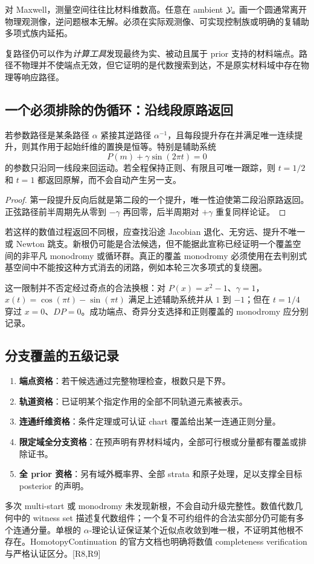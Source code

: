 对 Maxwell，测量空间往往比材料维数高。任意在 ambient $\mathcal Y_a$ 画一个圆通常离开物理观测像，逆问题根本无解。必须在实际观测像、可实现控制族或明确的复辅助多项式族内延拓。

复路径仍可以作为\emph{计算工具}发现最终为实、被动且属于 prior 支持的材料端点。路径不物理并不使端点无效，但它证明的是代数搜索到达，不是原实材料域中存在物理等响应路径。

\subsection{一个必须排除的伪循环：沿线段原路返回}

\begin{proposition}
若参数路径是某条路径 $\alpha$ 紧接其逆路径 $\alpha^{-1}$，且每段提升存在并满足唯一连续提升，则其作用于起始纤维的置换是恒等。特别是辅助系统
\begin{equation}
P(m)+\gamma\sin(2\pi t)=0
\end{equation}
的参数只沿同一线段来回运动。若全程保持正则、有限且可唯一跟踪，则 $t=1/2$ 和 $t=1$ 都返回原解，而不会自动产生另一支。
\end{proposition}
\begin{proof}
第一段提升反向后就是第二段的一个提升，唯一性迫使第二段沿原路返回。正弦路径前半周期先从零到 $-\gamma$ 再回零，后半周期对 $+\gamma$ 重复同样论证。
\end{proof}

若这样的数值过程返回不同根，应查找沿途 Jacobian 退化、无穷远、提升不唯一或 Newton 跳支。新根仍可能是合法候选，但不能据此宣称已经证明一个覆盖空间的非平凡 monodromy 或循环群。真正的覆盖 monodromy 必须使用在去判别式基空间中不能按这种方式消去的闭路，例如本轮三次多项式的复绕圈。

这一限制并不否定经过奇点的合法换根：对 $P(x)=x^2-1$、$\gamma=1$，$x(t)=\cos(\pi t)-\sin(\pi t)$ 满足上述辅助系统并从 $1$ 到 $-1$；但在 $t=1/4$ 穿过 $x=0$、$DP=0$。成功端点、奇异分支选择和正则覆盖的 monodromy 应分别记录。

\subsection{分支覆盖的五级记录}

\begin{enumerate}
\item \textbf{端点资格}：若干候选通过完整物理检查，根数只是下界。
\item \textbf{轨道资格}：已证明某个指定作用的全部不同轨道元素被表示。
\item \textbf{连通纤维资格}：条件定理或可认证 chart 覆盖给出某一连通正则分量。
\item \textbf{限定域全分支资格}：在预声明有界材料域内，全部可行根或分量都有覆盖或排除证书。
\item \textbf{全 prior 资格}：另有域外概率界、全部 strata 和原子处理，足以支撑全目标 posterior 的声明。
\end{enumerate}

多次 multi-start 或 monodromy 未发现新根，不会自动升级完整性。数值代数几何中的 witness set 描述复代数组件；一个复不可约组件的合法实部分仍可能有多个连通分量。单根的 $\alpha$-理论认证保证某个近似点收敛到唯一根，不证明其他根不存在。HomotopyContinuation 的官方文档也明确将数值 completeness verification 与严格认证区分。[R8,R9]
